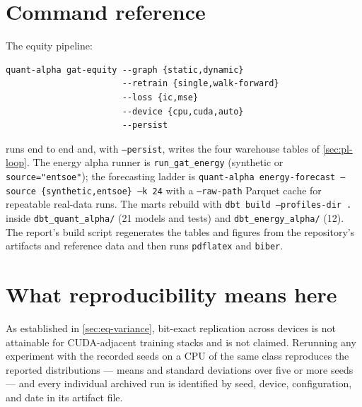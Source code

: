 \section*{Command reference}

The equity pipeline:
\begin{verbatim}
quant-alpha gat-equity --graph {static,dynamic}
                       --retrain {single,walk-forward}
                       --loss {ic,mse}
                       --device {cpu,cuda,auto}
                       --persist
\end{verbatim}
runs end to end and, with \texttt{--persist}, writes the four warehouse
tables of \cref{sec:pl-loop}. The energy alpha runner is
\texttt{run\_gat\_energy} (synthetic or \texttt{source="entsoe"}); the
forecasting ladder is \texttt{quant-alpha energy-forecast --source
\{synthetic,entsoe\} --k 24} with a \texttt{--raw-path} Parquet cache
for repeatable real-data runs. The marts rebuild with
\texttt{dbt build --profiles-dir .} inside \texttt{dbt\_quant\_alpha/}
(21 models and tests) and \texttt{dbt\_energy\_alpha/} (12). The
report's build script regenerates the tables and figures from the
repository's artifacts and reference data and then runs
\texttt{pdflatex} and \texttt{biber}.

\section*{What reproducibility means here}

As established in \cref{sec:eq-variance}, bit-exact replication across
devices is not attainable for CUDA-adjacent training stacks and is not
claimed. Rerunning any experiment with the recorded seeds on a CPU of
the same class reproduces the reported distributions --- means and
standard deviations over five or more seeds --- and every individual
archived run is identified by seed, device, configuration, and date in
its artifact file.
